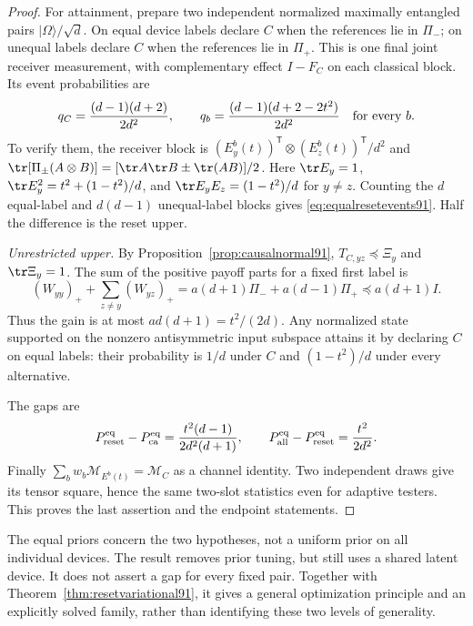 \begin{proof}
For attainment, prepare two independent normalized maximally entangled
pairs $|\Omega\rangle/\sqrt d$.  On equal device labels declare $C$
when the references lie in $\Pi_-$; on unequal labels declare $C$
when the references lie in $\Pi_+$.  This is one final joint receiver
measurement, with complementary effect $I-F_C$ on each classical
block.  Its event probabilities are
\begin{equation}\label{eq:equalresetevents91}
 q_C=\frac{(d-1)(d+2)}{2d^2},\qquad
 q_b=\frac{(d-1)(d+2-2t^2)}{2d^2}
 \quad\hbox{for every }b.
\end{equation}
To verify them, the receiver block is
$(E_y^b(t))^{\mathsf T}\otimes(E_z^b(t))^{\mathsf T}/d^2$ and
$\tr[\Pi_\pm(A\otimes B)]=[\tr A\tr B\pm\tr(AB)]/2$.
Here $\tr E_y=1$,
$\tr E_y^2=t^2+(1-t^2)/d$, and
$\tr E_yE_z=(1-t^2)/d$ for $y\ne z$.
Counting the $d$ equal-label and $d(d-1)$ unequal-label blocks gives
\eqref{eq:equalresetevents91}.  Half the difference is the reset upper.

\emph{Unrestricted upper.}
By Proposition~\ref{prop:causalnormal91}, $T_{C,yz}\preceq\Xi_y$
and $\tr\Xi_y=1$.  The sum of the positive payoff parts for a fixed
first label is
\[
 (W_{yy})_++\sum_{z\ne y}(W_{yz})_+
 =a(d+1)\Pi_-+a(d-1)\Pi_+\preceq a(d+1)I.
\]
Thus the gain is at most $ad(d+1)=t^2/(2d)$.
Any normalized state supported on the nonzero antisymmetric input
subspace attains it by declaring $C$ on equal labels: their probability
is $1/d$ under $C$ and $(1-t^2)/d$ under every alternative.

The gaps are
\begin{equation}\label{eq:equalgaps91}
 P_{\rm reset}^{\rm eq}-P_{\rm ca}^{\rm eq}
 =\frac{t^2(d-1)}{2d^2(d+1)},\qquad
 P_{\rm all}^{\rm eq}-P_{\rm reset}^{\rm eq}
 =\frac{t^2}{2d^2}.
\end{equation}
Finally $\sum_bw_b\mathcal M_{E^b(t)}=\mathcal M_C$ as a channel
identity.  Two independent draws give its tensor square, hence the
same two-slot statistics even for adaptive testers.  This proves the
last assertion and the endpoint statements.
\end{proof}
The equal priors concern the two hypotheses, not a uniform prior on all
individual devices.  The result removes prior tuning, but still uses
a shared latent device.  It does not assert a gap for every fixed pair.
Together with Theorem~\ref{thm:resetvariational91}, it gives a general
optimization principle and an explicitly solved family, rather than
identifying these two levels of generality.

